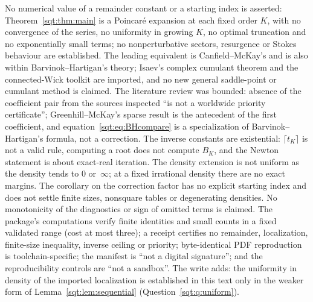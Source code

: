 \begin{writenote}
No numerical value of a remainder constant or a starting index is asserted:
Theorem~\ref{sqt:thm:main} is a Poincar\'e expansion at each fixed order $K$,
with no convergence of the series, no uniformity in growing $K$, no optimal
truncation and no exponentially small terms; no nonperturbative sectors,
resurgence or Stokes behaviour are established. The leading equivalent is
Canfield--McKay's and is also within Barvinok--Hartigan's theory; Isaev's
complex cumulant theorem and the connected-Wick toolkit are imported, and
no new general saddle-point or cumulant method is claimed. The literature
review was bounded: absence of the coefficient pair from the sources
inspected ``is not a worldwide priority certificate''; Greenhill--McKay's
sparse result is the antecedent of the first coefficient, and
equation~\eqref{sqt:eq:BHcompare} is a specialization of Barvinok--Hartigan's
formula, not a correction. The inverse constants are existential:
$\lceil t_K\rceil$ is not a valid rule, computing a root does not compute
$B_K$, and the Newton statement is about exact-real iteration. The density
extension is not uniform as the density tends to $0$ or~$\infty$; at a fixed
irrational density there are no exact margins. The corollary on the
correction factor has no explicit starting index and does not settle finite
sizes, nonsquare tables or degenerating densities. No monotonicity of the
diagnostics or sign of omitted terms is claimed. The package's computations
verify finite identities and small counts in a fixed validated range (cost at
most three); a receipt certifies no remainder, localization, finite-size
inequality, inverse ceiling or priority; byte-identical PDF reproduction is
toolchain-specific; the manifest is ``not a digital signature''; and the
reproducibility controls are ``not a sandbox''. The write adds: the
uniformity in density of the imported localization is established in this
text only in the weaker form of Lemma~\ref{sqt:lem:sequential}
(Question~\ref{sqt:q:uniform}).
\end{writenote}
